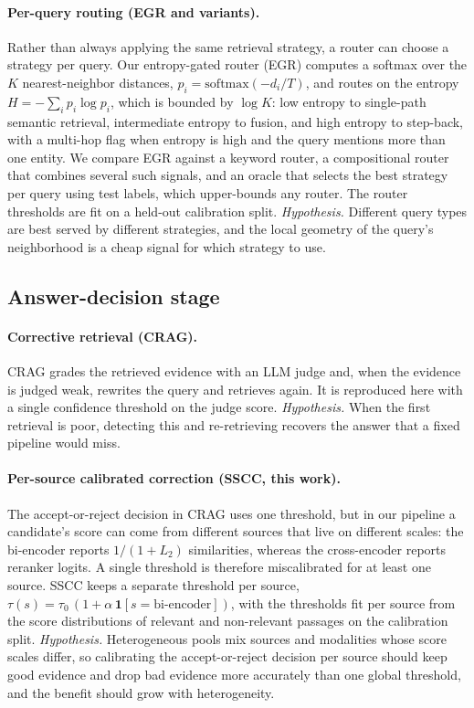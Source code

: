 \documentclass[10pt,twocolumn]{article}
\begin{document}
\paragraph{Per-query routing (EGR and variants).}
Rather than always applying the same retrieval strategy, a router can choose a
strategy per query. Our entropy-gated router (EGR) computes a softmax over the
$K$ nearest-neighbor distances, $p_i = \mathrm{softmax}(-d_i/T)$, and routes on
the entropy $H = -\sum_i p_i \log p_i$, which is bounded by $\log K$: low entropy
to single-path semantic retrieval, intermediate entropy to fusion, and high
entropy to step-back, with a multi-hop flag when entropy is high and the query
mentions more than one entity. We compare EGR against a keyword router, a
compositional router that combines several such signals, and an oracle that
selects the best strategy per query using test labels, which upper-bounds any
router. The router thresholds are fit on a held-out calibration split.
\emph{Hypothesis.} Different query types are best served by different strategies,
and the local geometry of the query's neighborhood is a cheap signal for which
strategy to use.

\subsection{Answer-decision stage}
\paragraph{Corrective retrieval (CRAG).}
CRAG \cite{yan2024crag} grades the retrieved evidence with an LLM judge and, when
the evidence is judged weak, rewrites the query and retrieves again. It is
reproduced here with a single confidence threshold on the judge score.
\emph{Hypothesis.} When the first retrieval is poor, detecting this and
re-retrieving recovers the answer that a fixed pipeline would miss.

\paragraph{Per-source calibrated correction (SSCC, this work).}
The accept-or-reject decision in CRAG uses one threshold, but in our pipeline a
candidate's score can come from different sources that live on different scales:
the bi-encoder reports $1/(1+L_2)$ similarities, whereas the cross-encoder
reports reranker logits. A single threshold is therefore miscalibrated for at
least one source. SSCC keeps a separate threshold per source,
$\tau(s) = \tau_0\,(1 + \alpha\,\mathbf{1}[s = \text{bi-encoder}])$, with the
thresholds fit per source from the score distributions of relevant and
non-relevant passages on the calibration split.
\emph{Hypothesis.} Heterogeneous pools mix sources and modalities whose score
scales differ, so calibrating the accept-or-reject decision per source should
keep good evidence and drop bad evidence more accurately than one global
threshold, and the benefit should grow with heterogeneity.
\end{document}
